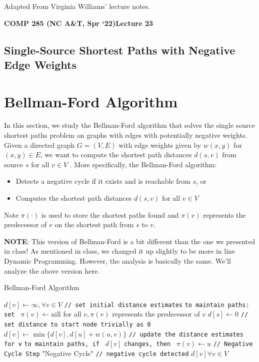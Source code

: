 \documentclass [12pt]{article}
\theoremstyle{definition}
\begin{document}
 

\vspace {1em} 
\begin {Instruction} 
Adapted From Virginia Williams' lecture notes.
\end {Instruction}  

{\LARGE \textbf {COMP 285 (NC A\&T, Spr `22)}\hfill \textbf {Lecture 23} } 

\begin{centering}
\section*{Single-Source Shortest Paths with Negative Edge Weights}
\end{centering}

\section{Bellman-Ford Algorithm} 
In this section, we study the Bellman-Ford algorithm that solves the single source shortest paths problem on graphs with edges with potentially negative weights. Given a directed graph $G = (V, E)$ with edge weights given by $w(x, y )$ for $(x, y ) \in E$, we want to compute the shortest path distances $d(s, v )$ from source $s$ for all $v \in V$ . More specifically, the Bellman-Ford algorithm: 

\begin{itemize}
  \item Detects a negative cycle if it exists and is reachable from $s$, or 
  \item Computes the shortest path distances $d(s, v )$ for all $v \in V$
\end{itemize} 

Note $\pi(\cdot)$ is used to store the shortest paths found and $\pi(v )$ represents the predecessor of $v$ on the shortest path from $s$ to $v$.

\textbf{NOTE}: This version of Bellman-Ford is a bit different than the one we presented in class! As mentioned in class, we changed it up slightly to be more in line Dynamic Programming. However, the analysis is basically the same. We'll analyze the above version here.

\begin{algorithm}
\caption{Bellman-Ford Algorithm}
\label{alg:1}
\begin{algorithmic}
\STATE $d[v] \gets \infty, \forall v \in V$ \texttt{// set initial distance estimates}
\STATE \texttt{to maintain paths: set } $\pi(v) \gets $nill for all $v, \pi(v)$ represents the predecessor of $v$
\STATE $d[s] \gets 0$ \texttt{// set distance to start node trivially as 0}
    \STATE $d[v] \gets \min\{d[v], d[u] + w(u,v) \}$ \texttt{// update the distance estimates for v}
    \STATE \texttt{to maintain paths, if } $d[v]$ \texttt{changes, then } $\pi(v) \gets u$
  \ENDFOR
\ENDFOR
\STATE \texttt{// Negative Cycle Step}
    \RETURN "Negative Cycle" \texttt{// negative cycle detected}
  \ENDIF
\ENDFOR
\RETURN $d[v] \forall v \in V$
\end{algorithmic}
\end{algorithm}
\end{document}
